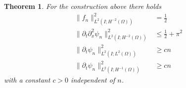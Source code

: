 \documentclass{m2an}
\newcommand{\1}{\mathds{1}}
\newtheorem{theorem}{Theorem}[section]
\theoremstyle{definition}
\begin{document}
\begin{theorem}
For the construction above there holds
\begin{subequations}
\begin{align}
        \|f_n\|^2_{L^2(I;H^{-2}(\Omega))} &= \frac{1}{2} \label{eq:app_est_1}\\
        \|\partial_t \partial^2_x \psi_n\|^2_{L^2(I;H^{-2}(\Omega))} &\le \frac{1}{2} +\pi^2 \label{eq:app_est_2}\\
        \|\partial_t \psi_n\|^2_{L^2(I;L^2(\Omega))} & \ge cn \label{eq:app_est_3}\\
        \|\partial_t \psi_n\|^2_{L^2(I;H^{-1}(\Omega))} &\ge cn \label{eq:app_est_4}
\end{align}
\end{subequations}
with a constant $c>0$ independent of $n$.
\end{theorem}
\end{document}
